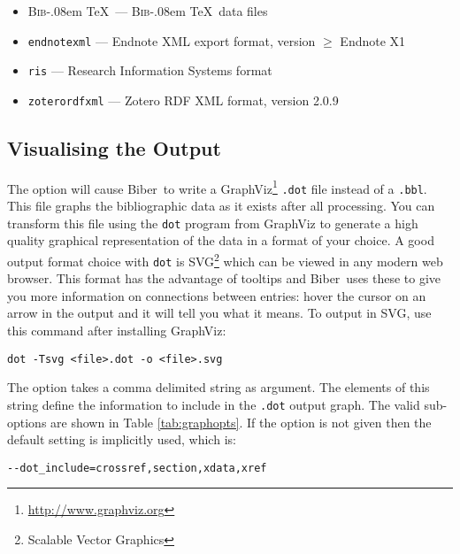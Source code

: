 \documentclass{ltxdockit}
\def\BibTeX{\textsc{Bib}\kern-.08em \TeX}
\newcommand*{\biber}{Biber\xspace}
\begin{document}
\begin{itemize}
\item \BibTeX\ --- \BibTeX\ data files
\item \verb+endnotexml+ --- Endnote XML export format, version $\geq$ Endnote X1
\item \verb+ris+ --- Research Information Systems format
\item \verb+zoterordfxml+ --- Zotero RDF XML format, version 2.0.9
\end{itemize}

\subsection{Visualising the Output}\label{ref:vis}

The option  will cause \biber\ to write a
GraphViz\footnote{\url{http://www.graphviz.org}} \verb+.dot+ file instead
of a \verb+.bbl+. This file graphs the bibliographic data as it exists
after all processing. You can transform this file using the \verb+dot+
program from GraphViz to generate a high quality graphical representation
of the data in a format of your choice. A good output format choice with
\verb+dot+ is SVG\footnote{Scalable Vector Graphics} which can be viewed in
any modern web browser. This format has the advantage of tooltips and \biber\
uses these to give you more information on connections between entries:
hover the cursor on an arrow in the output and it will tell you what it
means. To output in SVG, use this command after installing GraphViz:

\begin{verbatim}
dot -Tsvg <file>.dot -o <file>.svg
\end{verbatim}

\noindent The  option takes a comma delimited string as
argument. The elements of this string define the information to include in
the \verb+.dot+ output graph. The valid sub-options are shown in Table
\ref{tab:graphopts}. If the \opt{--dot-include} option is not given
then the default setting is implicitly used, which is:

\begin{verbatim}
--dot_include=crossref,section,xdata,xref
\end{verbatim}
\end{document}

